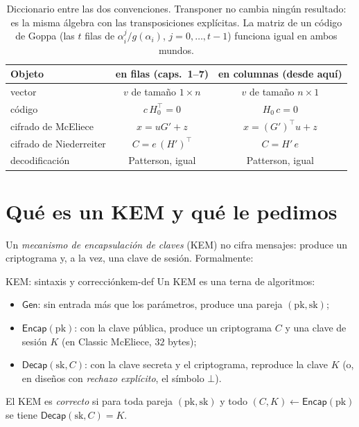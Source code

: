 \documentclass[11pt,a4paper,oneside]{report}
\begin{document}
\begin{table}[htbp]
\centering
\small
\begin{tabular}{lcc}
\toprule
Objeto & en filas (caps.~1--7) & en columnas (desde aquí)\\
\midrule
vector & $v$ de tamaño $1\times n$ & $v$ de tamaño $n\times1$\\
código & $c\,H_0^{\top}=0$ & $H_0\,c=0$\\
cifrado de McEliece & $x=uG'+z$ & $x=(G')^{\top}u+z$\\
cifrado de Niederreiter & $C=e\,(H')^{\top}$ & $C=H'\,e$\\
decodificación & Patterson, igual & Patterson, igual\\
\bottomrule
\end{tabular}
\caption{Diccionario entre las dos convenciones. Transponer no cambia
ningún resultado: es la misma álgebra con las transposiciones
explícitas. La matriz de un código de Goppa (las $t$ filas de
$\alpha_i^{j}/g(\alpha_i)$, $j=0,\dots,t-1$) funciona igual en ambos
mundos.}
\label{tab:kem-columnas}
\end{table}

\section{Qué es un KEM y qué le pedimos}

Un \emph{mecanismo de encapsulación de claves} (KEM) no cifra mensajes:
produce un criptograma y, a la vez, una clave de sesión. Formalmente:

\begin{definicion}{KEM: sintaxis y corrección}{kem-def}
Un KEM es una terna de algoritmos:
\begin{itemize}[leftmargin=1.5em,itemsep=2pt]
  \item $\textsf{Gen}$: sin entrada más que los parámetros, produce una
        pareja $(\mathrm{pk},\mathrm{sk})$;
  \item $\textsf{Encap}(\mathrm{pk})$: con la clave pública, produce un
        criptograma $C$ y una clave de sesión $K$ (en Classic McEliece,
        $32$ bytes);
  \item $\textsf{Decap}(\mathrm{sk},C)$: con la clave secreta y el
        criptograma, reproduce la clave $K$ (o, en diseños con
        \emph{rechazo explícito}, el símbolo $\bot$).
\end{itemize}
El KEM es \emph{correcto} si para toda pareja $(\mathrm{pk},\mathrm{sk})$
y todo $(C,K)\leftarrow\textsf{Encap}(\mathrm{pk})$ se tiene
$\textsf{Decap}(\mathrm{sk},C)=K$.
\end{definicion}
\end{document}
